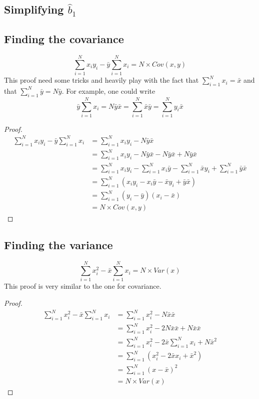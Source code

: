 \documentclass[a4paper,12pt]{article}
\newcommand\bhat[1]{\hat{b}_#1}
\newcommand\sumin{\sum_{i=1}^N}
\begin{document}
\clearpage
\begin{appendices}
\section{Simplifying $\bhat{1}$}
\subsection{Finding the covariance}
\[
\sumin x_i y_i - \bar{y} \sumin x_i =  N \times Cov(x,y)
\]
This proof need some tricks and heavily play with the fact that $\sumin x_i = \bar{x}$ and that $\sumin \bar{y} = N \bar{y}$. For example, one could write
\[
	\bar{y} \sumin x_i = N\bar{y}\bar{x} = \sumin \bar{x}\bar{y} =\sumin y_i \bar{x}
\]

\begin{proof}
	\begin{align*}
		\sumin x_i y_i - \bar{y} \sumin x_i &= \sumin x_i y_i - N\bar{y}\bar{x}\\
		&= \sumin x_i y_i - N\bar{y}\bar{x} - N\bar{y}\bar{x} +  N\bar{y}\bar{x}\\
		&= \sumin x_i y_i - \sumin x_i \bar{y} - \sumin \bar{x} y_i +  \sumin \bar{y}\bar{x} \\
		& = \sumin (x_i y_i -  x_i \bar{y} - \bar{x} y_i + \bar{y}\bar{x}) \\
		&= \sumin (y_i - \bar{y}) (x_i - \bar{x}) \\ 
		&= N \times Cov(x,y)
	\end{align*}
\end{proof}

\subsection{Finding the variance}
\[
\sumin x_i^2 - \bar{x} \sumin x_i = N \times Var(x)
\]
This proof is very similar to the one for covariance.

\begin{proof}
	\begin{align*}
		\sumin x_i^2 - \bar{x} \sumin x_i &= \sumin x_i^2 - N\bar{x}\bar{x}\\
		&= \sumin x_i^2 - 2N\bar{x}\bar{x} + N\bar{x}\bar{x} \\
		&= \sumin x_i^2 - 2 \bar{x} \sumin x_i + N\bar{x}^2 \\
		&= \sumin (x_i^2 - 2\bar{x}x_i + \bar{x}^2) \\
		&= \sumin (x - \bar{x})^2 \\
		&= N \times Var(x)
	\end{align*}
\end{proof}

\end{appendices}
\end{document}
